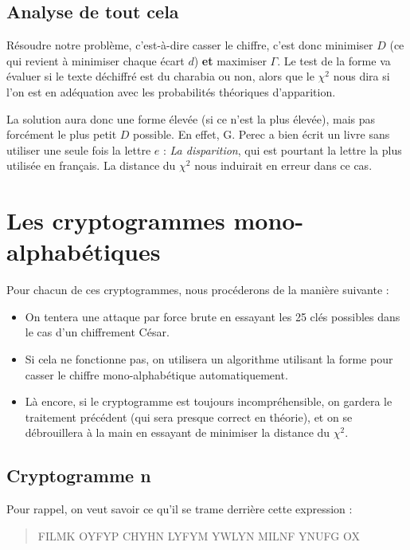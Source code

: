 \documentclass[a4paper, titlepage]{livret}
\begin{document}
\subsection{Analyse de tout cela}

Résoudre notre problème, c'est-à-dire casser le chiffre, c'est donc minimiser $D$ (ce qui revient à minimiser chaque écart $d$) \textbf{et} maximiser $\Gamma$.
Le test de la forme va évaluer si le texte déchiffré est du charabia ou non, alors que le $\chi^{2}$ nous dira si l'on est en adéquation avec les probabilités théoriques d'apparition.

La solution aura donc une forme élevée (si ce n'est la plus élevée), mais pas forcément le plus petit $D$ possible.
En effet, G. Perec a bien écrit un livre sans utiliser une seule fois la lettre $e$ : \emph{La disparition}, qui est pourtant la lettre la plus utilisée en français. La distance du $\chi^{2}$ nous induirait en erreur dans ce cas.


\section{Les cryptogrammes mono-alphabétiques}
Pour chacun de ces cryptogrammes, nous procéderons de la manière suivante : 
\begin{itemize}
\item On tentera une attaque par force brute en essayant les 25 clés possibles dans le cas d'un chiffrement César.
\item Si cela ne fonctionne pas, on utilisera un algorithme utilisant la forme pour casser le chiffre mono-alphabétique automatiquement.
\item Là encore, si le cryptogramme est toujours incompréhensible, on gardera le traitement précédent (qui sera presque correct en théorie), et on se débrouillera à la main en essayant de minimiser la distance du $\chi^{2}$.
\end{itemize}

\subsection{Cryptogramme n}

Pour rappel, on veut savoir ce qu'il se trame derrière cette expression :
\begin{center}
\begin{quote}
\og FILMK OYFYP CHYHN LYFYM YWLYN MILNF YNUFG OX \fg{}
\end{quote}
\end{center}
\end{document}
